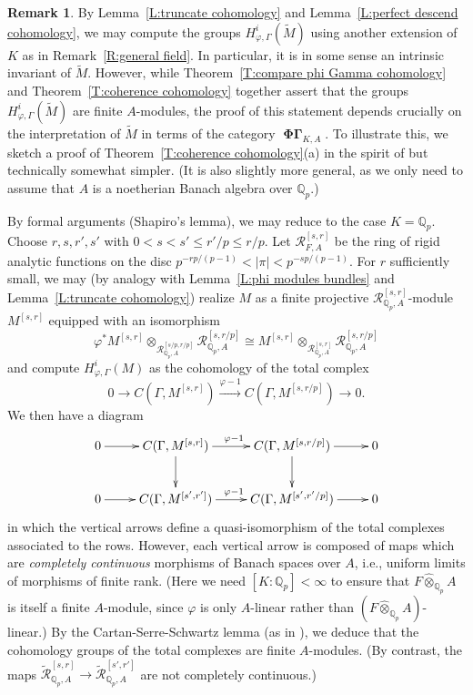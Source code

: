 \documentclass[12pt]{amsart}
\theoremstyle{definition}
\newtheorem{remark}[theorem]{Remark}
\numberwithin{equation}{theorem}
\newcommand{\QQ}{\mathbb{Q}}
\newcommand{\calR}{\mathcal{R}}
\DeclareMathOperator{\PhiGamma}{\mathbf{\Phi \Gamma}}
\begin{document}
\begin{remark}
By Lemma~\ref{L:truncate cohomology} and Lemma~\ref{L:perfect descend cohomology},
we may compute the groups $H^i_{\varphi, \Gamma}(\tilde{M})$
using another extension of $K$ as in Remark~\ref{R:general field}. In particular, it is in some sense an intrinsic invariant of $\tilde{M}$. However, while Theorem~\ref{T:compare phi Gamma cohomology} and Theorem~\ref{T:coherence cohomology} together assert that the groups $H^i_{\varphi, \Gamma}(\tilde{M})$
are finite $A$-modules,
the proof of this statement depends crucially on the interpretation of $\tilde{M}$ in terms of the category $\PhiGamma_{K,A}$. 
To illustrate this, we sketch a proof of Theorem~\ref{T:coherence cohomology}(a) in the spirit of \cite{kpx} but technically somewhat simpler. (It is also slightly more general,
as we only need to assume that $A$ is a noetherian Banach algebra over $\QQ_p$.)

By formal arguments (Shapiro's lemma), we may reduce to the case $K = \QQ_p$.
Choose $r,s,r',s'$ with $0 < s < s' \leq r'/p \leq r/p$. 
Let $\calR^{[s,r]}_{F,A}$ be the ring of rigid analytic functions 
on the disc $p^{-rp/(p-1)} < \left| \pi \right| < p^{-sp/(p-1)}$. For $r$ sufficiently small, we may (by analogy with Lemma~\ref{L:phi modules bundles} and Lemma~\ref{L:truncate cohomology}) realize $M$ as a finite projective $\calR^{[s,r]}_{\QQ_p,A}$-module $M^{[s,r]}$
equipped with an isomorphism 
\[
\varphi^* M^{[s,r]} \otimes_{\calR^{[s/p,r/p]}_{\QQ_p,A}} \calR^{[s,r/p]}_{\QQ_p,A} 
\cong M^{[s,r]} \otimes_{\calR^{[s,r]}_{\QQ_p,A}} \calR^{[s,r/p]}_{\QQ_p,A}
\]
and compute $H^i_{\varphi, \Gamma}(M)$ as the cohomology of the total complex
\[
0 \to C(\Gamma, M^{[s,r]}) \stackrel{\varphi-1}{\to} C(\Gamma, M^{[s,r/p]}) \to 0.
\]
We then have a diagram
\[
\xymatrix{
0 \ar[r] & C(\Gamma, M^{[s,r]}) \ar[d] \ar^{\varphi-1}[r] & C(\Gamma, M^{[s,r/p]}) \ar[r] \ar[d] & 0 \\
0 \ar[r] & C(\Gamma, M^{[s',r']}) \ar^{\varphi-1}[r] & C(\Gamma, M^{[s',r'/p]}) \ar[r] & 0
}
\]
in which the vertical arrows define a quasi-isomorphism of the total complexes associated to the rows. However, each vertical arrow is composed of maps which are  \emph{completely continuous} morphisms of Banach spaces over $A$, i.e., uniform limits of morphisms of finite rank. 
(Here we need $[K:\QQ_p] < \infty$ to ensure that $F \widehat{\otimes}_{\QQ_p} A$ is itself a finite $A$-module, since $\varphi$ is only $A$-linear rather than $(F \widehat{\otimes}_{\QQ_p} A)$-linear.)
By the Cartan-Serre-Schwartz lemma (as in \cite[Satz~2.6]{kiehl-finiteness}), we deduce that the cohomology groups of the total complexes are finite $A$-modules.
(By contrast, the maps $\tilde{\calR}^{[s,r]}_{\QQ_p,A} \to \tilde{\calR}^{[s',r']}_{\QQ_p,A}$ are not completely continuous.)
\end{remark}
\end{document}

